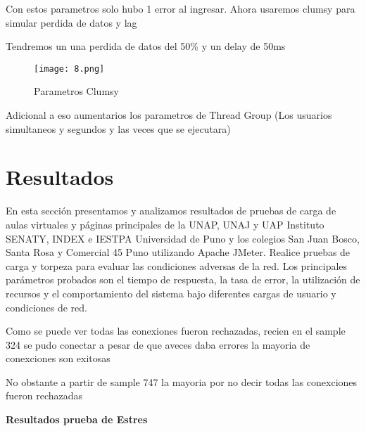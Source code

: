 \documentclass{article}
\begin{document}
Con estos parametros solo hubo 1 error al ingresar. Ahora usaremos clumsy para simular perdida de datos y lag

Tendremos un una perdida de datos del 50\% y un delay de 50ms

\begin{figure}[H]
    \centering
    \texttt{[image: 8.png]}
    \caption{Parametros Clumsy}
    \label{fig:enter-label}
\end{figure}

Adicional a eso aumentarios los parametros de Thread Group (Los usuarios simultaneos y segundos y las veces que se ejecutara)

\section{Resultados}

En esta sección presentamos y analizamos resultados de pruebas de carga de aulas virtuales y páginas principales de la UNAP, UNAJ y UAP Instituto SENATY, INDEX e IESTPA Universidad de Puno y los colegios San Juan Bosco, Santa Rosa y Comercial 45 Puno utilizando Apache JMeter. Realice pruebas de carga y torpeza para evaluar las condiciones adversas de la red. Los principales parámetros probados son el tiempo de respuesta, la tasa de error, la utilización de recursos y el comportamiento del sistema bajo diferentes cargas de usuario y condiciones de red.

Como se puede ver todas las conexiones fueron rechazadas, recien en el sample 324 se pudo conectar a pesar de que aveces daba errores la mayoria de conexciones son exitosas

No obstante a partir de sample 747 la mayoria por no decir todas las conexciones fueron rechazadas

\textbf{Resultados prueba de Estres}

\begin{table}[h!]
\centering
\caption{Datos de Universidades - Tabla 1}
\label{tab:table1}
\end{table}
\end{document}
